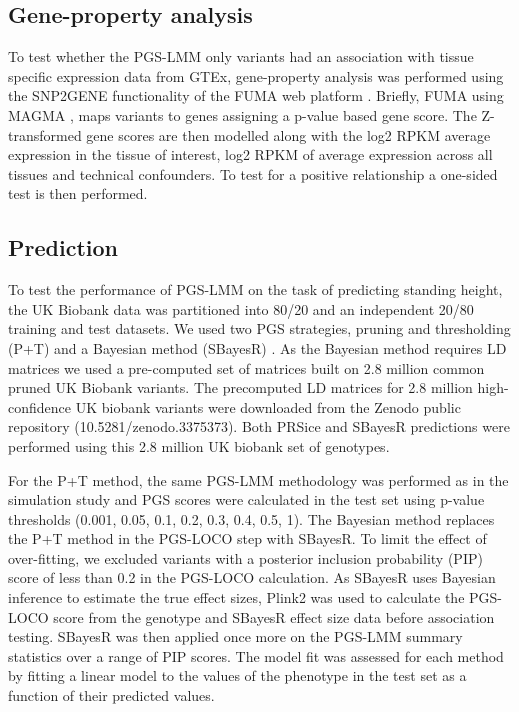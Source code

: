 \documentclass[doublespacing]{bmcart}
\begin{document}
\subsection*{Gene-property analysis}

To test whether the PGS-LMM only variants had an association with tissue specific expression data from  GTEx, gene-property analysis was performed using the SNP2GENE functionality of the FUMA web platform \cite{watanabe2017functional}. Briefly, FUMA using MAGMA \cite{de2015magma}, maps variants to genes assigning a p-value based gene score. The Z-transformed gene scores are then modelled along with the log2 RPKM average expression in the tissue of interest, log2 RPKM of average expression across all tissues and technical confounders. To test for a positive relationship a one-sided test is then performed.  

\subsection*{Prediction}
To test the performance of PGS-LMM on the task of predicting standing height, the UK Biobank data was partitioned into 80/20 and an independent 20/80 training and test datasets. We used two PGS strategies, pruning and thresholding (P+T) and a Bayesian method (SBayesR) \cite{choi2019prsice,lloyd2019improved}. As the Bayesian method requires LD matrices we used a pre-computed set of matrices built on 2.8 million common pruned UK Biobank variants. The precomputed LD matrices for 2.8 million high-confidence UK biobank variants were downloaded from the Zenodo public repository (10.5281/zenodo.3375373). Both PRSice and SBayesR predictions were performed using this 2.8 million UK biobank set of genotypes. \par

For the P+T method, the same PGS-LMM methodology was performed as in the simulation study and PGS scores were calculated in the test set using p-value thresholds (0.001, 0.05, 0.1, 0.2, 0.3, 0.4, 0.5, 1). The Bayesian method replaces the P+T method in the PGS-LOCO step with SBayesR. To limit the effect of over-fitting, we excluded variants with a posterior inclusion probability (PIP) score of less than 0.2 in the PGS-LOCO calculation. As SBayesR uses Bayesian inference to estimate the true effect sizes, Plink2 was used to calculate the PGS-LOCO score from the genotype and SBayesR effect size data before association testing. SBayesR was then applied once more on the PGS-LMM summary statistics over a range of PIP scores. The model fit was assessed for each method by fitting a linear model to the values of the phenotype in the test set as a function of their predicted values.\par
\end{document}
